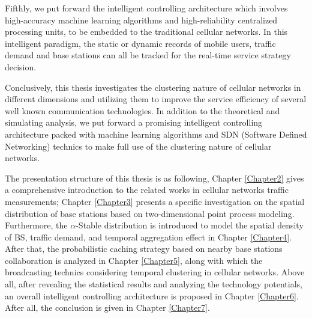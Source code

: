 Fifthly, we put forward the intelligent controlling architecture which involves high-accuracy machine learning algorithms and high-reliability centralized processing units, to be embedded to the traditional cellular networks. In this intelligent paradigm, the static or dynamic records of mobile users, traffic demand and base stations can all be tracked for the real-time service strategy decision.

Conclusively, this thesis investigates the clustering nature of cellular networks in different dimensions and utilizing them to improve the service efficiency of several well known communication technologies. In addition to the theoretical and simulating analysis, we put forward a promising intelligent controlling architecture packed with machine learning algorithms and SDN (Software Defined Networking) technics to make full use of the clustering nature of cellular networks.

The presentation structure of this thesis is as following, Chapter \ref{Chapter2} gives a comprehensive introduction to the related works in cellular networks traffic measurements; Chapter \ref{Chapter3} presents a specific investigation on the spatial distribution of base stations based on two-dimensional point process modeling. Furthermore, the $\alpha$-Stable distribution is introduced to model the spatial density of BS, traffic demand, and temporal aggregation effect in Chapter \ref{Chapter4}. After that, the probabilistic caching strategy based on nearby base stations collaboration is analyzed in Chapter \ref{Chapter5}, along with which the broadcasting technics considering temporal clustering in cellular networks. Above all, after revealing the statistical results and analyzing the technology potentials, an overall intelligent controlling architecture is proposed in Chapter \ref{Chapter6}. After all, the conclusion is given in Chapter \ref{Chapter7}.





